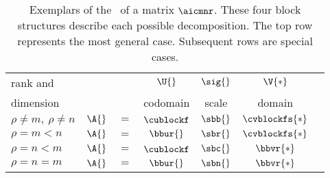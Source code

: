 \begin{table}[htdp]
\caption[Exemplars of the \asvd]{Exemplars of the \asvd \ of a matrix $\aicmnr$. These four block structures describe each possible decomposition. The top row represents the most general case. Subsequent rows are special cases.}
\begin{center}
\begin{tabular}{lcccccc}
%
 rank and  &&& $\U{}$ & $\sig{}$ & $\V{*}$\\
 dimension &&& codomain & scale  & domain \\\hline
%
  $\rho \ne m,\ \rho \ne n$ \qquad \qquad & $\A{}$ & $=$ & $\cublockf$ & $\sbb{}$ & $\cvblockfs{*}$  \\[15pt]
%
  $\rho = m < n$   & $\A{}$ & $=$ & $\bbur{}$      & $\sbr{}$ & $\cvblockfs{*}$  \\[15pt]
%
  $\rho = n < m$   & $\A{}$ & $=$ & $\cublockf$    & $\sbc{}$ & $\bbvr{*}$  \\[15pt]
%
  $\rho = n  =  m$ & $\A{}$ & $=$ & $\bbur{}$      & $\sbn{}$ & $\bbvr{*}$  \\
%
\end{tabular}
\end{center}
\label{tab:svden:exmplars}
\end{table}

\endinput